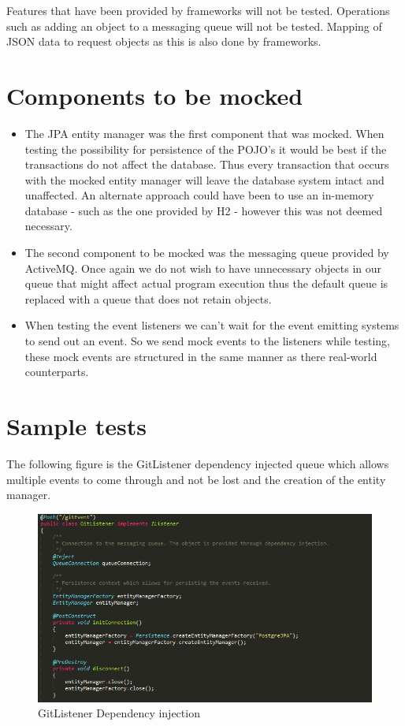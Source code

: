 \documentclass[11pt,a4paper]{article}
\begin{document}
Features that have been provided by frameworks will not be tested. Operations such as adding an object to a messaging queue will not be tested. Mapping of JSON data to request objects as this is also done by frameworks.

\section{Components to be mocked}
\begin{itemize}
	\item The JPA entity manager was the first component that was mocked. When testing the possibility for persistence of the POJO's it would be best if the transactions do not affect the database. Thus every transaction that occurs with the mocked entity manager will leave the database system intact and unaffected. An alternate approach could have been to use an in-memory database - such as the one provided by H2 - however this was not deemed necessary. \\
	
	\item The second component to be mocked was the messaging queue provided by ActiveMQ. Once again we do not wish to have unnecessary objects in our queue that might affect actual program execution thus the default queue is replaced with a queue that does not retain objects. \\
	
	\item When testing the event listeners we can't wait for the event emitting systems to send out an event. So we send mock events to the listeners while testing, these mock events are structured in the same manner as there real-world counterparts.
\end{itemize}

\section{Sample tests}
The following figure is the GitListener dependency injected queue which allows multiple events to come through and not be lost and the creation of the entity manager.
\begin{figure}[H]
	\begin{center}
		\includegraphics[scale=0.7]{../Images/sample3.PNG}
		\caption{GitListener Dependency injection}
	\end{center}
\end{figure}
\end{document}
